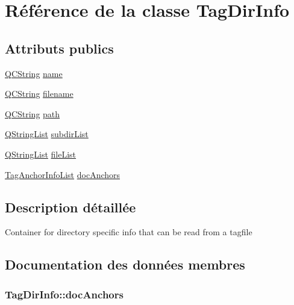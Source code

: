 \hypertarget{class_tag_dir_info}{}\section{Référence de la classe Tag\+Dir\+Info}
\label{class_tag_dir_info}
\subsection*{Attributs publics}
\begin{DoxyCompactItemize}
\item 
\hyperlink{class_q_c_string}{Q\+C\+String} \hyperlink{class_tag_dir_info_a5cfeefe508646d16441497e8fedf5781}{name}
\item 
\hyperlink{class_q_c_string}{Q\+C\+String} \hyperlink{class_tag_dir_info_aa23bec9b1cf39df5803c6d6d2a8a4023}{filename}
\item 
\hyperlink{class_q_c_string}{Q\+C\+String} \hyperlink{class_tag_dir_info_a55aa3de3e3bfdd5dbf01f59356459ccd}{path}
\item 
\hyperlink{class_q_string_list}{Q\+String\+List} \hyperlink{class_tag_dir_info_aa92f9d1b26a45555036ae1fd4b32600e}{subdir\+List}
\item 
\hyperlink{class_q_string_list}{Q\+String\+List} \hyperlink{class_tag_dir_info_a768be96c04e1196b7383de14306752b3}{file\+List}
\item 
\hyperlink{class_tag_anchor_info_list}{Tag\+Anchor\+Info\+List} \hyperlink{class_tag_dir_info_af9cee7f9aab8052dcfae09a6c04cbbe1}{doc\+Anchors}
\end{DoxyCompactItemize}


\subsection{Description détaillée}
Container for directory specific info that can be read from a tagfile 

\subsection{Documentation des données membres}
\hypertarget{class_tag_dir_info_af9cee7f9aab8052dcfae09a6c04cbbe1}{}
\subsubsection[{doc\+Anchors}]{ Tag\+Dir\+Info\+::doc\+Anchors}\label{class_tag_dir_info_af9cee7f9aab8052dcfae09a6c04cbbe1}
\hypertarget{class_tag_dir_info_a768be96c04e1196b7383de14306752b3}{}
